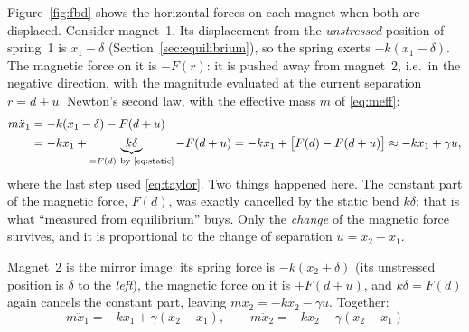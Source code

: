 \documentclass[11pt,a4paper]{article}
\begin{document}
Figure~\ref{fig:fbd} shows the horizontal forces on each magnet when both are displaced. Consider magnet~1. Its displacement from the \emph{unstressed} position of spring~1 is $x_1-\delta$ (Section~\ref{sec:equilibrium}), so the spring exerts $-k(x_1-\delta)$. The magnetic force on it is $-F(r)$: it is pushed away from magnet~2, i.e.\ in the negative direction, with the magnitude evaluated at the current separation $r=d+u$. Newton's second law, with the effective mass $m$ of \eqref{eq:meff}:
\begin{align}
m\ddot x_1&=-k(x_1-\delta)-F(d+u)\notag\\
          &=-kx_1+\underbrace{k\delta}_{=F(d)\ \text{by \eqref{eq:static}}}-F(d+u)
           =-kx_1+\big[F(d)-F(d+u)\big]\approx-kx_1+\gamma u ,
\label{eq:newton1}
\end{align}
where the last step used \eqref{eq:taylor}. Two things happened here. The constant part of the magnetic force, $F(d)$, was exactly cancelled by the static bend $k\delta$: that is what ``measured from equilibrium'' buys. Only the \emph{change} of the magnetic force survives, and it is proportional to the change of separation $u=x_2-x_1$.

Magnet~2 is the mirror image: its spring force is $-k(x_2+\delta)$ (its unstressed position is $\delta$ to the \emph{left}), the magnetic force on it is $+F(d+u)$, and $k\delta=F(d)$ again cancels the constant part, leaving $m\ddot x_2=-kx_2-\gamma u$. Together:
\begin{equation}
\boxed{\;m\ddot x_1=-kx_1+\gamma(x_2-x_1),\qquad m\ddot x_2=-kx_2-\gamma(x_2-x_1)\;}
\label{eq:eom}
\end{equation}
\end{document}
